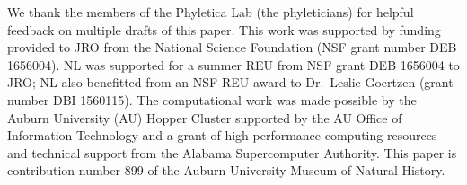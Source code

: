 We thank the members of the Phyletica Lab (the phyleticians) for helpful
feedback on multiple drafts of this paper.
This work was supported by funding provided to JRO from the National Science
Foundation (NSF grant number DEB 1656004).
NL was supported for a summer REU from NSF grant DEB 1656004 to JRO;
NL also benefitted from an NSF REU award to Dr.\ Leslie Goertzen (grant number
DBI 1560115).
The computational work was made possible by the Auburn University (AU) Hopper
Cluster supported by the AU Office of Information Technology
and
a grant of high-performance computing resources and technical support from the
Alabama Supercomputer Authority.
This paper is contribution number 899 of the Auburn University
Museum of Natural History.

